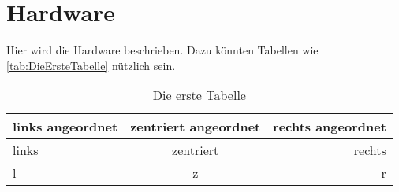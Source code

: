

\section{Hardware} \label{sec:Hardware}

Hier wird die Hardware beschrieben. Dazu könnten Tabellen wie \autoref{tab:DieErsteTabelle} nützlich sein.
		
		
\begin{table}[htbp]
	\centering																	%
	\caption{Die erste Tabelle}													%
	\label{tab:DieErsteTabelle}													%
	\begin{tabular}{l|c|r}														%
		links angeordnet	& zentriert angeordnet	& rechts angeordnet \\ 		%
		\hline 																	%
		links 				& zentriert 			& rechts \\					%
		l 					& z			 			& r \\					%
		
	\end{tabular}
\end{table}